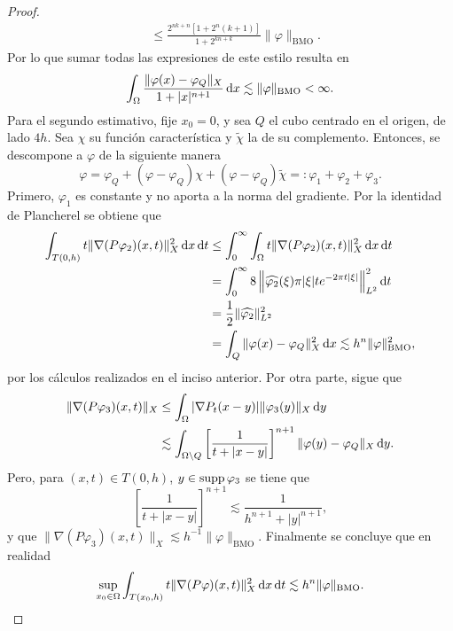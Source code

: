\begin{proof}
\begin{align*}
		& \leq \frac{2^{nk+n} [1+2^n(k+1)]}{1+2^{kn+k}}\|\varphi\|_{\mathrm{BMO}}.
	\end{align*}
	Por lo que sumar todas las expresiones de este estilo resulta en 
	\begin{equation*}
		\int_{\Omega} \frac{\|\varphi(x)-\varphi_Q\|_X}{1+|x|^{n+1}} \mathop{}\!\mathrm{d} x \lesssim \|\varphi\|_{\mathrm{BMO}} < \infty.
	\end{equation*}
	Para el segundo estimativo, fije $x_0=0$, y sea $Q$ el cubo centrado en el origen, de lado $4h$. Sea $\chi$ su función característica y $\tilde{\chi}$ la de su complemento. Entonces, se descompone a $\varphi$ de la siguiente manera
	\begin{equation*}
		\varphi = \varphi_Q + (\varphi - \varphi_Q)\chi + (\varphi - \varphi_Q)\tilde{\chi} =: \varphi_1 + \varphi_2 + \varphi_3.
	\end{equation*}
	Primero, $\varphi_1$ es constante y no aporta a la norma del gradiente. Por la identidad de Plancherel se obtiene que 
	\begin{align*}
		\int_{T(0, h)} t\|\nabla (P\varphi_2)(x, t)\|_X^2 \mathop{}\!\mathrm{d} x \mathop{}\!\mathrm{d} t & \leq \int_0^\infty \int_{\Omega} t\|\nabla (P\varphi_2)(x, t)\|_X^2 \mathop{}\!\mathrm{d} x \mathop{}\!\mathrm{d} t  \\
		& = \int_0^\infty 8\left\|\widehat{\varphi_2}(\xi) \pi|\xi|  te^{-2\pi t|\xi|}\right\|_{L^2}^2 \mathop{}\!\mathrm{d} t \\
		& = \frac{1}{2} \|\widehat{\varphi_2}\|_{L^2}^2 \\
		& = \int_Q \|\varphi(x) - \varphi_Q\|_X^2 \mathop{}\!\mathrm{d} x \lesssim h^n \|\varphi\|_{\mathrm{BMO}}^2,
	\end{align*}
	por los cálculos realizados en el inciso anterior. Por otra parte, sigue que
	\begin{align*}
		\|\nabla(P\varphi_3)(x, t)\|_X & \leq \int_{\Omega} |\nabla P_t(x-y)|\|\varphi_3(y)\|_X\mathop{}\!\mathrm{d} y \\
		& \lesssim \int_{\Omega\setminus Q} \left[ \frac{1}{t+|x-y|}
		\right]^{n+1} \|\varphi(y) - \varphi_Q\|_X\mathop{}\!\mathrm{d} y.
	\end{align*}
	Pero, para $(x, t) \in T(0, h)$, $y \in \operatorname{supp} \varphi_3$ se tiene que
	\begin{equation*}
		\left[ \frac{1}{t+|x-y|}
		\right]^{n+1} \lesssim \frac{1}{h^{n+1} + |y|^{n+1}},
	\end{equation*}
	y que $\|\nabla (P\varphi_3)(x, t)\|_X \lesssim h^{-1}\|\varphi\|_{\mathrm{BMO}}$. Finalmente se concluye que en realidad
	\begin{equation*}
		\sup_{x_0\in\Omega}\int_{T(x_0, h)} t\|\nabla (P\varphi)(x, t)\|_X^2\diff x \diff t \lesssim h^n\|\varphi\|_{\mathrm{BMO}}.

\end{equation*}
\end{proof}
